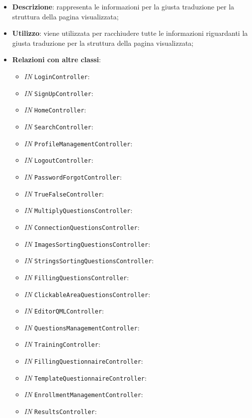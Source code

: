 		\begin{itemize}
			\item \textbf{Descrizione}: rappresenta le informazioni per la giusta traduzione per la struttura della pagina visualizzata;
			\item \textbf{Utilizzo}: viene utilizzata per racchiudere tutte le informazioni riguardanti la giusta traduzione per la struttura della pagina visualizzata;
			\item \textbf{Relazioni con altre classi}: 
			\begin{itemize}
				\item \textit{IN} \texttt{LoginController}: 
				\item \textit{IN} \texttt{SignUpController}: 
				\item \textit{IN} \texttt{HomeController}: 
				\item \textit{IN} \texttt{SearchController}: 
				\item \textit{IN} \texttt{ProfileManagementController}: 
				\item \textit{IN} \texttt{LogoutController}: 
				\item \textit{IN} \texttt{PasswordForgotController}:
				\item \textit{IN} \texttt{TrueFalseController}: 
				\item \textit{IN} \texttt{MultiplyQuestionsController}: 
				\item \textit{IN} \texttt{ConnectionQuestionsController}: 
				\item \textit{IN} \texttt{ImagesSortingQuestionsController}: 
				\item \textit{IN} \texttt{StringsSortingQuestionsController}: 
				\item \textit{IN} \texttt{FillingQuestionsController}: 
				\item \textit{IN} \texttt{ClickableAreaQuestionsController}: 
				\item \textit{IN} \texttt{EditorQMLController}: 
				\item \textit{IN} \texttt{QuestionsManagementController}: 
				\item \textit{IN} \texttt{TrainingController}: 
				\item \textit{IN} \texttt{FillingQuestionnaireController}: 
				\item \textit{IN} \texttt{TemplateQuestionnaireController}: 
				\item \textit{IN} \texttt{EnrollmentManagementController}: 
				\item \textit{IN} \texttt{ResultsController}: 

\end{itemize}
\end{itemize}
